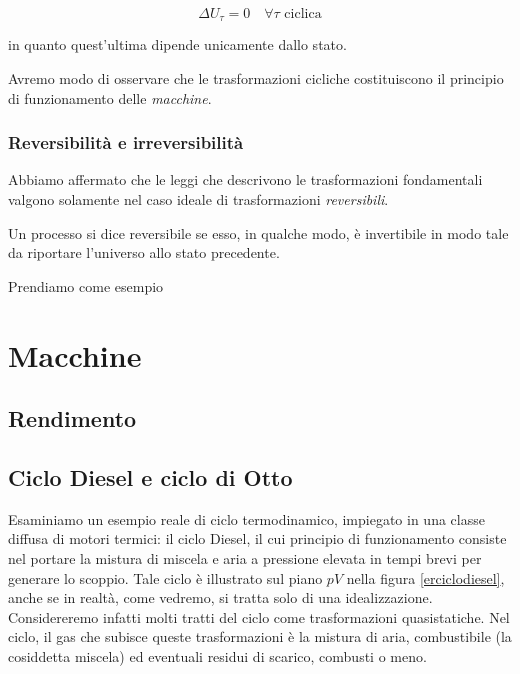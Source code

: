 \[ \Delta U_\tau = 0 \quad \forall \tau \text{ ciclica} \]

\noindent in quanto quest'ultima dipende unicamente dallo stato.

Avremo modo di osservare che le trasformazioni cicliche costituiscono
il principio di funzionamento delle \textit{macchine}.


\subsubsection*{Reversibilità e irreversibilità}
Abbiamo affermato che le leggi che descrivono le trasformazioni fondamentali
valgono solamente nel caso ideale di trasformazioni \textit{reversibili}.

\begin{tcolorbox}[colback = yellow!30, colframe = yellow!30!black, title = {Trasformazioni reversibili}]
    Un processo si dice reversibile se esso, in qualche modo, è
    invertibile in modo tale da riportare l'universo allo stato
    precedente.
\end{tcolorbox}

\noindent Prendiamo come esempio




\section{Macchine}

\subsection{Rendimento}


\subsection{Ciclo Diesel e ciclo di Otto}
Esaminiamo un esempio reale di ciclo termodinamico, impiegato in
una classe diffusa di motori termici: il ciclo Diesel, il cui
principio di funzionamento consiste nel portare la mistura di
miscela e aria a pressione elevata in tempi brevi per generare
lo scoppio. Tale ciclo
è illustrato sul piano $pV$ nella figura \ref{erciclodiesel}, anche
se in realtà, come vedremo, si tratta solo di una idealizzazione.
Considereremo infatti molti tratti del ciclo come trasformazioni
quasistatiche. Nel ciclo, il gas che subisce queste trasformazioni
è la mistura di aria, combustibile (la cosiddetta miscela) ed
eventuali residui di scarico, combusti o meno.


